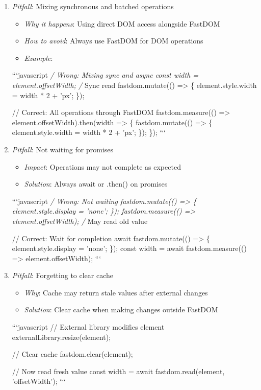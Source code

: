 \documentclass[11pt]{article}
\begin{document}
\begin{enumerate}
\item \emph{Pitfall}: Mixing synchronous and batched operations
\begin{itemize}
\item \emph{Why it happens}: Using direct DOM access alongside FastDOM
\item \emph{How to avoid}: Always use FastDOM for DOM operations
\item \emph{Example}:
\end{itemize}
```javascript
\emph{/ Wrong: Mixing sync and async
const width = element.offsetWidth; /} Sync read
fastdom.mutate(() => \{
  element.style.width = width * 2 + 'px';
\});

// Correct: All operations through FastDOM
fastdom.measure(() => element.offsetWidth).then(width => \{
  fastdom.mutate(() => \{
    element.style.width = width * 2 + 'px';
  \});
\});
```

\item \emph{Pitfall}: Not waiting for promises
\begin{itemize}
\item \emph{Impact}: Operations may not complete as expected
\item \emph{Solution}: Always await or .then() on promises
\end{itemize}
```javascript
\emph{/ Wrong: Not waiting
fastdom.mutate(() => \{
  element.style.display = 'none';
\});
fastdom.measure(() => element.offsetWidth); /} May read old value

// Correct: Wait for completion
await fastdom.mutate(() => \{
  element.style.display = 'none';
\});
const width = await fastdom.measure(() => element.offsetWidth);
```

\item \emph{Pitfall}: Forgetting to clear cache
\begin{itemize}
\item \emph{Why}: Cache may return stale values after external changes
\item \emph{Solution}: Clear cache when making changes outside FastDOM
\end{itemize}
```javascript
// External library modifies element
externalLibrary.resize(element);

// Clear cache
fastdom.clear(element);

// Now read fresh value
const width = await fastdom.read(element, 'offsetWidth');
```
\end{enumerate}
\end{document}
